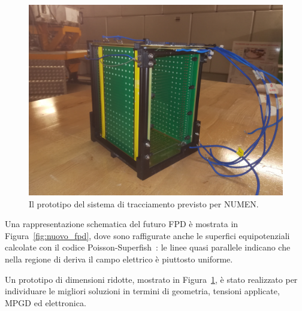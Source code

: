 \begin{figure} [!p]
	\centering
	\includegraphics[width=\textwidth, keepaspectratio]{Grafici/castelletto3.jpg}
	\caption{Il prototipo del sistema di tracciamento previsto per NUMEN.} \label{fig:castelletto}
\end{figure}



Una rappresentazione schematica del futuro FPD è mostrata in Figura~\ref{fig:nuovo_fpd}, dove sono raffigurate anche le superfici equipotenziali calcolate con il codice Poisson-Superfish~\cite{superfish:87}: le linee quasi parallele indicano che nella regione di deriva il campo elettrico è piuttosto uniforme.


Un prototipo di dimensioni ridotte, mostrato in Figura~\ref{fig:castelletto}, è stato realizzato per individuare le migliori soluzioni in termini di geometria, tensioni applicate, MPGD ed elettronica.








\vspace{0.5 cm}


\section{}

